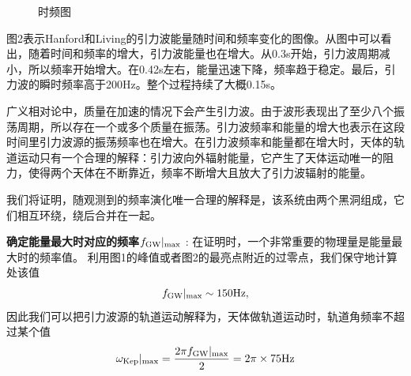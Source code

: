 \documentclass[UTF8]{ctexart}
\begin{document}
\begin{figure}[!htbp]
	\centering
	\caption{时频图}
\end{figure}
图2表示Hanford和Living的引力波能量随时间和频率变化的图像。从图中可以看出，随着时间和频率的增大，引力波能量也在增大。从0.3s开始，引力波周期减小，所以频率开始增大。在0.42s左右，能量迅速下降，频率趋于稳定。最后，引力波的瞬时频率高于200Hz。整个过程持续了大概0.15s。

广义相对论中，质量在加速的情况下会产生引力波。由于波形表现出了至少八个振荡周期，所以存在一个或多个质量在振荡。引力波频率和能量的增大也表示在这段时间里引力波源的振荡频率也在增大。在引力波频率和能量都在增大时，天体的轨道运动只有一个合理的解释：引力波向外辐射能量，它产生了天体运动唯一的阻力，使得两个天体在不断靠近，频率不断增大且放大了引力波辐射的能量。

我们将证明，随观测到的频率演化唯一合理的解释是，该系统由两个黑洞组成，它们相互环绕，绕后合并在一起。

\textbf{确定能量最大时对应的频率}$f_{\rm GW}|_{\rm max}$ : 在证明时，一个非常重要的物理量是能量最大时的频率值。 利用图1的峰值或者图2的最亮点附近的过零点，我们保守地计算处该值
\begin{equation}
f_{\rm GW}|_{\rm max} \sim 150{\rm Hz},
\end{equation}
因此我们可以把引力波源的轨道运动解释为，天体做轨道运动时，轨道角频率不超过某个值
\begin{equation}
\omega_{\rm Kep}|_{\rm max}=\frac{2\pi f_{\rm GW}|_{\rm max}}{2} = 2\pi \times 75 {\rm Hz}
\end{equation}
\end{document}
